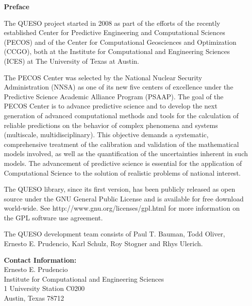 \clearpage
$~$\\

\clearpage
{\markboth{}{}
}
\tableofcontents


\clearpage
\thispagestyle{empty}
\centerline{\Large\bf Preface}
$~$\\
The QUESO project started in 2008 as part
of the efforts of the recently established Center for Predictive Engineering and Computational Sciences (PECOS)
and of the Center for Computational Geosciences and Optimization (CCGO), both at
the Institute for Computational and Engineering Sciences (ICES) at The University of Texas at Austin.

The PECOS Center was selected by the National Nuclear Security Administration (NNSA) as one of its new five centers of excellence
under the Predictive Science Academic Alliance Program (PSAAP).
The goal of the PECOS Center is
to advance predictive science and to develop the next generation of advanced computational methods and tools
for the calculation of reliable predictions on the behavior of complex phenomena and systems (multiscale, multidisciplinary).
This objective demands a systematic, comprehensive treatment of the calibration and validation of the mathematical models involved,
as well as the quantification of the uncertainties inherent in such models.
The advancement of predictive science is essential for the application of Computational Science to the solution of realistic problems of national interest.

The QUESO library, since its first version, has been publicly released as open source
under the GNU General Public License and is available for free download world-wide.
See http://www.gnu.org/licenses/gpl.html for more information on the GPL software use agreement.

The QUESO development team consists of
Paul T. Bauman,
Todd Oliver,
Ernesto E. Prudencio,
Karl Schulz,
Roy Stogner and
Rhys Ulerich.

{\bf Contact Information:}\\
Ernesto E. Prudencio\\
Institute for Computational and Engineering Sciences\\
1 University Station C0200\\
Austin, Texas 78712

